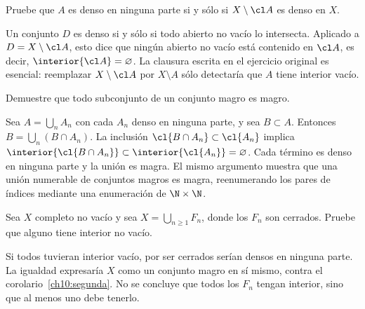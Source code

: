 \begin{ejercicio}\label{ej:lectura-10-4}
Pruebe que $A$ es denso en ninguna parte si y sólo si $X\setminus\cl A$ es denso en $X$.
\end{ejercicio}
\begin{solucion}
Un conjunto $D$ es denso si y sólo si todo abierto no vacío lo intersecta. Aplicado a $D=X\setminus\cl A$, esto dice que ningún abierto no vacío está contenido en $\cl A$, es decir, $\interior{\cl A}=\varnothing$. La clausura escrita en el ejercicio original es esencial: reemplazar $X\setminus\cl A$ por $X\setminus A$ sólo detectaría que $A$ tiene interior vacío.
\end{solucion}

\begin{ejercicio}\label{ej:lectura-10-5}
Demuestre que todo subconjunto de un conjunto magro es magro.
\end{ejercicio}
\begin{solucion}
Sea $A=\bigcup_nA_n$ con cada $A_n$ denso en ninguna parte, y sea $B\subset A$. Entonces $B=\bigcup_n(B\cap A_n)$. La inclusión $\cl{B\cap A_n}\subset\cl{A_n}$ implica $\interior{\cl{B\cap A_n}}\subset\interior{\cl{A_n}}=\varnothing$. Cada término es denso en ninguna parte y la unión es magra. El mismo argumento muestra que una unión numerable de conjuntos magros es magra, reenumerando los pares de índices mediante una enumeración de $\N\times\N$.
\end{solucion}

\begin{ejercicio}\label{ej:lectura-10-6}
Sea $X$ completo no vacío y sea $X=\bigcup_{n\geq1}F_n$, donde los $F_n$ son cerrados. Pruebe que alguno tiene interior no vacío.
\end{ejercicio}
\begin{solucion}
Si todos tuvieran interior vacío, por ser cerrados serían densos en ninguna parte. La igualdad expresaría $X$ como un conjunto magro en sí mismo, contra el corolario~\ref{ch10:segunda}. No se concluye que todos los $F_n$ tengan interior, sino que al menos uno debe tenerlo.
\end{solucion}

